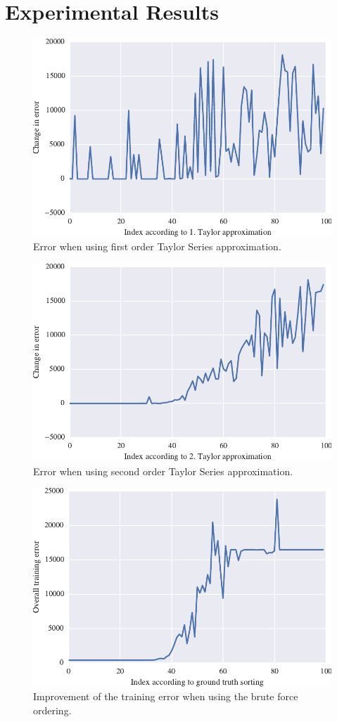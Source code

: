\section{Experimental Results}

\begin{figure}
\centering
\includegraphics[width=0.6\linewidth]{error1.pdf}
\caption{Error when using first order Taylor Series approximation.}
\label{fig:error1}
\end{figure}

\begin{figure}
\centering
\includegraphics[width=0.6\linewidth]{error2.pdf}
\caption{Error when using second order Taylor Series approximation.}
\label{fig:error2}
\end{figure}

\begin{figure}
\centering
\includegraphics[width=0.6\linewidth]{improvement1.pdf}
\caption{Improvement of the training error when using the brute force ordering.}
\label{fig:improvement1}
\end{figure}


